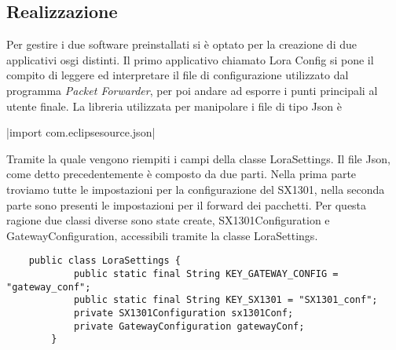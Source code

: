 \subsection{Realizzazione}
Per gestire i due software preinstallati si è optato per la creazione di due
applicativi osgi distinti.
Il primo applicativo chiamato Lora Config si pone il compito di leggere ed
interpretare il file di configurazione utilizzato dal programma \emph{Packet
Forwarder}, per poi andare ad esporre i punti principali al utente finale.
La libreria utilizzata per manipolare i file di tipo Json è 

|import com.eclipsesource.json|

Tramite la quale vengono riempiti i campi della classe LoraSettings. Il file
Json, come detto precedentemente è composto da due parti. Nella prima parte
troviamo tutte le impostazioni per la configurazione del SX1301, nella seconda
parte sono presenti le impostazioni per il forward dei pacchetti. Per questa
ragione due classi diverse sono state create, SX1301Configuration e
GatewayConfiguration, accessibili tramite la classe LoraSettings.

\begin{verbatim}
    public class LoraSettings {
            public static final String KEY_GATEWAY_CONFIG = "gateway_conf";
            public static final String KEY_SX1301 = "SX1301_conf";
            private SX1301Configuration sx1301Conf;
            private GatewayConfiguration gatewayConf;
        }
\end{verbatim}

